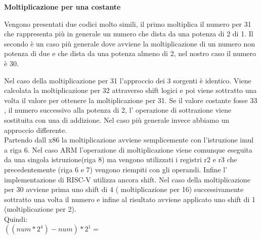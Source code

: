 \documentclass[12pt,a4paper]{report}
\begin{document}
\vspace{0.3 cm}

\textbf{Moltiplicazione per una costante}

Vengono presentati due codici molto simili, il primo moltiplica il numero per 31 che rappresenta più in generale un numero che dista da una potenza di 2 di 1. Il secondo è un caso più generale dove avviene la moltiplicazione di un numero non potenza di due e che dista da una potenza almeno di 2, nel nostro caso il numero è 30.

\vspace{0.2 cm }

\begin{figure}[h]
	\begin{subfigure}[b]{0.4\textwidth}
         
          	
		
     \end{subfigure}
     \hfill
     \begin{subfigure}[b]{0.4\textwidth}
         
          	
		
     \end{subfigure}
     
\end{figure}

\vspace{0.3 cm}

Nel caso della moltiplicazione per 31 l'approccio dei 3 sorgenti è identico. Viene calcolata la moltiplicazione per 32 attraverso shift logici e poi viene sottratto una volta il valore per ottenere la moltiplicazione per 31. Se il valore costante fosse 33 , il numero successivo alla potenza di 2, l' operazione di sottrazione viene sostituita con una di addizione. Nel caso più generale invece abbiamo un approccio differente.\\
Partendo dall x86 la moltiplicazione avviene semplicemente con l'istruzione imul a riga 6.  Nel caso ARM l'operazione di moltiplicazione viene comunque eseguita da una singola istruzione(riga 8) ma vengono utilizzati i registri r2 e r3 che precedentemente (riga 6 e 7) vengono riempiti con gli operandi. Infine l' implementazione di RISC-V utilizza ancora shift. Nel caso della moltiplicazione per 30 avviene prima uno shift di 4 ( moltiplicazione per 16) successivamente sottratto una volta il numero e infine al risultato avviene applicato uno shift di 1 (moltiplicazione per 2). \\ Quindi: \\ 
$((num * 2^4) - num ) * 2^1 = $ 
\end{document}
